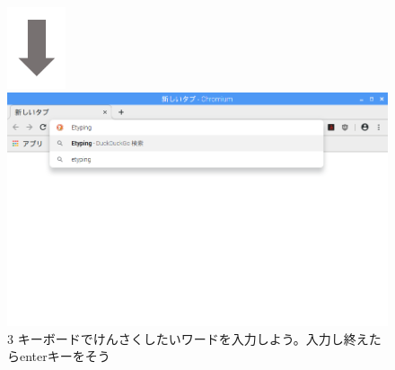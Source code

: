 \begin{figure}[t]
  \hfill\begin{minipage}{0.45\textwidth}
    {\centering
      \includegraphics[width=1.707cm]{text01-img/textbook-img074.png}
    }\\
    \includegraphics[width=\linewidth]{text01-img/textbook-img072.png}
    3 キーボードでけんさくしたいワードを入力しよう。入力し終えたらenterキーをそう
  \end{minipage}

  \vspace{70mm}

\end{figure}
\clearpage


